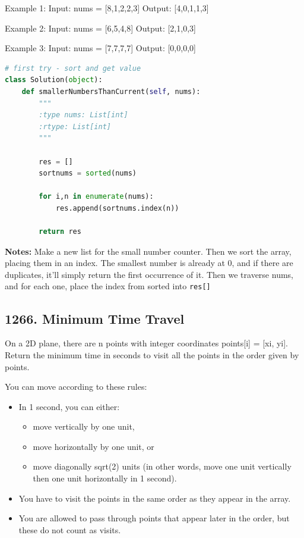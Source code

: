 \documentclass[11pt]{article}
\begin{document}
 

Example 1:
Input: nums = [8,1,2,2,3]
Output: [4,0,1,1,3]

Example 2:
Input: nums = [6,5,4,8]
Output: [2,1,0,3]

Example 3:
Input: nums = [7,7,7,7]
Output: [0,0,0,0]

\begin{lstlisting}[language=python, mathescape=true]
# first try - sort and get value
class Solution(object):
    def smallerNumbersThanCurrent(self, nums):
        """
        :type nums: List[int]
        :rtype: List[int]
        """

        res = []
        sortnums = sorted(nums)

        for i,n in enumerate(nums):
            res.append(sortnums.index(n))

        return res
\end{lstlisting}

\noindent \textbf{Notes:} Make a new list for the small number counter. Then we sort the array, placing them in an index. The smallest number is already at 0, and if there are duplicates, it'll simply return the first occurrence of it. Then we traverse nums, and for each one, place the index from sorted into \texttt{res[]}

\subsection*{1266. Minimum Time Travel}
On a 2D plane, there are n points with integer coordinates points[i] = [xi, yi]. Return the minimum time in seconds to visit all the points in the order given by points.

You can move according to these rules:
\begin{itemize}
    \item In 1 second, you can either:
    \begin{itemize}
        \item move vertically by one unit,
        \item move horizontally by one unit, or
        \item move diagonally sqrt(2) units (in other words, move one unit vertically then one unit horizontally in 1 second).
    \end{itemize}
    \item You have to visit the points in the same order as they appear in the array.
    \item You are allowed to pass through points that appear later in the order, but these do not count as visits.
\end{itemize}
 
\end{document}
